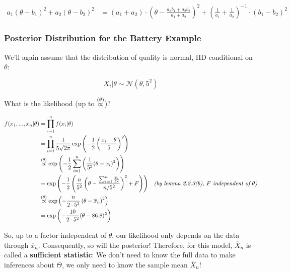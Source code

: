 \documentclass[a4paper]{article}
\begin{document}
                    \begin{align*}
                        a_1(\theta - b_1)^2 + a_2(\theta - b_2)^2 & =
                            (a_1 + a_2) \cdot \left(\theta - \frac{a_1b_1 +
                            a_2b_2}{a_1 + a_2}\right)^2 + \left(\frac{1}{a_1} +
                            \frac{1}{a_2}\right)^{-1} \cdot (b_1 - b_2)^2
                    \end{align*}

            \subsubsection{Posterior Distribution for the Battery Example}
                We'll again assume that the distribution of quality is normal,
                IID conditional on $\theta$:

                \[
                    X_i | \theta \sim \mathcal{N}(\theta, 5^2)
                \]

                What is the likelihood (up to $\stackrel{({\theta})}{\propto}$)?

                \begin{align*}
                    f(x_1, ..., x_n | \theta) & = \prod_{i=1}^n f(x_i | \theta)
                        \\
                    & = \prod_{i = 1}^n \frac{1}{5\sqrt{2\pi}} \exp\left(-
                        \frac{1}{2} \left(\frac{x_i - \theta}{5}\right)^2\right)
                        \\
                    & \stackrel{({\theta})}{\propto} \exp\left(-\frac{1}{2}\sum_{i=1}^n \left(
                        \frac{1}{5^2} (\theta - x_i)^2\right)\right) \\
                    & = \exp\left(-\frac{1}{2}\left(\frac{n}{5^2} \left(\theta -
                        \frac{\sum_{i=1}^n \frac{x_i}{5^2}}{n/5^2}\right)^2 + F
                        \right)\right)& \textit{(by lemma 2.2.3(b), $F$
                        independent of $\theta$)} \\
                    & \stackrel{({\theta})}{\propto} \exp\left(-\frac{n}{2 \cdot 5^2}\left(
                        \theta - \overline x_n\right)^2\right) \\
                    & = \exp\left(-\frac{10}{2 \cdot 5^2}(\theta - 86.8)^2
                        \right)
                \end{align*}

                So, up to a factor independent of $\theta$, our likelihood only
                depends on the data through $\overline x_n$. Consequently, so
                will the posterior! Therefore, for this model, $\overline X_n$
                is called a \textbf{sufficient statistic}: We don't need to know
                the full data to make inferences about $\Theta$, we only need to
                know the sample mean $\overline X_n$!
\end{document}
